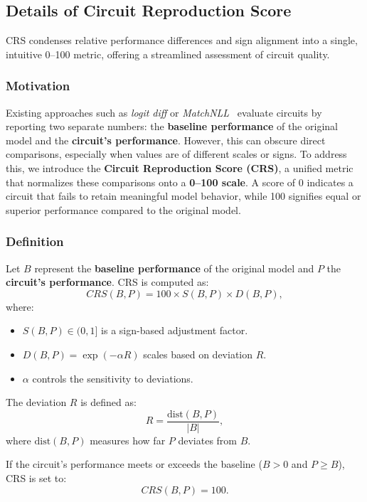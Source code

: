 \subsection{Details of Circuit Reproduction Score}
\label{sec:detail_in_crs}
CRS condenses relative performance differences and sign alignment into a single, intuitive 0–100 metric, offering a streamlined assessment of circuit quality.

\subsubsection{Motivation}
Existing approaches such as \textit{logit diff} or \textit{MatchNLL}~\citep{conmy2023towards, KC} evaluate circuits by reporting two separate numbers: the \textbf{baseline performance} of the original model and the \textbf{circuit’s performance}. However, this can obscure direct comparisons, especially when values are of different scales or signs. To address this, we introduce the \textbf{Circuit Reproduction Score (CRS)}, a unified metric that normalizes these comparisons onto a \textbf{0–100 scale}. A score of 0 indicates a circuit that fails to retain meaningful model behavior, while 100 signifies equal or superior performance compared to the original model.

\subsubsection{Definition}
Let $B$ represent the \textbf{baseline performance} of the original model and $P$ the \textbf{circuit’s performance}. CRS is computed as:
\begin{equation}
CRS(B, P) = 100 \times S(B,P) \times D(B,P),
\end{equation}
where:
\begin{itemize}
    \item $S(B,P) \in (0,1]$ is a sign-based adjustment factor.
    \item $D(B,P) = \exp(-\alpha R)$ scales based on deviation $R$.
    \item $\alpha$ controls the sensitivity to deviations.
\end{itemize}

The deviation $R$ is defined as:
\begin{equation}
R = \frac{\text{dist}(B,P)}{|B|},
\end{equation}
where $\text{dist}(B,P)$ measures how far $P$ deviates from $B$.

If the circuit’s performance meets or exceeds the baseline ($B > 0$ and $P \geq B$), CRS is set to:
\begin{equation}
CRS(B, P) = 100.
\end{equation}

